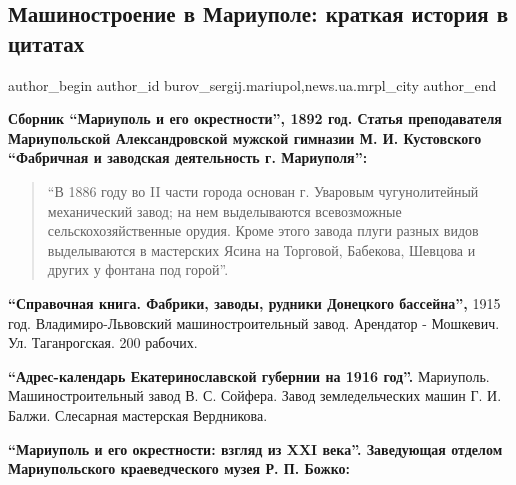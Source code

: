  
 
 
 
 
 
\subsection{Машиностроение в Мариуполе: краткая история в цитатах}
\label{sec:21_09_2019.stz.news.ua.mrpl_city.1.mashinostroenie_v_mariupole_kratkaja_istoria_v_citatah}
 
\ifcmt
 author_begin
   author_id burov_sergij.mariupol,news.ua.mrpl_city
 author_end
\fi


\textbf{Сборник \enquote{Мариуполь и его окрестности}, 1892 год. Статья преподавателя
Мариупольской Александровской мужской гимназии М. И. Кустовского \enquote{Фабричная и
заводская деятельность г. Мариуполя}:} 

\begin{quote}
\enquote{В 1886 году во II части города основан г. Уваровым чугунолитейный механический
завод; на нем выделываются всевозможные сельскохозяйственные орудия. Кроме
этого завода плуги разных видов выделываются в мастерских Ясина на Торговой,
Бабекова, Шевцова и других у фонтана под горой}.
\end{quote}

\textbf{\enquote{Справочная книга. Фабрики, заводы, рудники Донецкого бассейна},} 1915 год.
Владимиро-Львовский машиностроительный завод. Арендатор - Мошкевич. Ул.
Таганрогская. 200 рабочих.

\textbf{\enquote{Адрес-календарь Екатеринославской губернии на 1916 год}.} Мариуполь.
Машиностроительный завод В. С. Сойфера. Завод земледельческих машин Г. И. Балжи.
Слесарная мастерская Вердникова.

\textbf{\enquote{Мариуполь и его окрестности: взгляд из XXI века}. Заведующая отделом
Мариупольского краеведческого музея Р. П. Божко:} 

